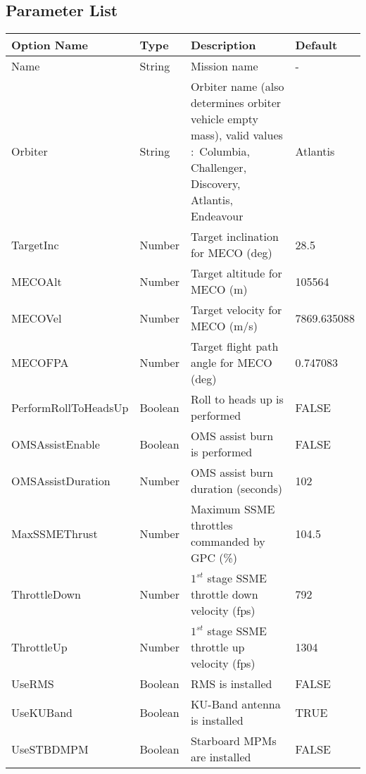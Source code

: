 \documentclass[Space_Shuttle_Ultra_Manual.tex]{subfiles}
\begin{document}
\newpage

\subsection{Parameter List}
\begin{table}[H]
  \centering
  \begin{tabular}{|l|p{1.5cm}|p{8cm}|l|}
	\hline
	\rule{0pt}{2ex}
	\textbf{Option Name} & \textbf{Type} & \textbf{Description} & \textbf{Default}\\
	\hline
	\rule{0pt}{2ex}
	Name & String & Mission name & -\\
	\hline
	\rule{0pt}{2ex}
	Orbiter & String & Orbiter name (also determines orbiter vehicle empty mass), valid values$\colon $ Columbia, Challenger, Discovery, Atlantis, Endeavour & Atlantis\\
	\hline
	\rule{0pt}{2ex}
	TargetInc & Number & Target inclination for MECO (deg) & 28.5\\
	\hline
	\rule{0pt}{2ex}
	MECOAlt & Number & Target altitude for MECO (m) & 105564\\
	\hline
	\rule{0pt}{2ex}
	MECOVel & Number & Target velocity for MECO (m/s) & 7869.635088\\
	\hline
	\rule{0pt}{2ex}
	MECOFPA & Number & Target flight path angle for MECO (deg) & 0.747083\\
	\hline
	\rule{0pt}{2ex}
	PerformRollToHeadsUp & Boolean & Roll to heads up is performed & FALSE\\
	\hline
	\rule{0pt}{2ex}
	OMSAssistEnable & Boolean & OMS assist burn is performed & FALSE\\
	\hline
	\rule{0pt}{2ex}
	OMSAssistDuration & Number & OMS assist burn duration (seconds) & 102\\
	\hline
	\rule{0pt}{2ex}
	MaxSSMEThrust & Number & Maximum SSME throttles commanded by GPC (\%) & 104.5\\
	\hline
	\rule{0pt}{2ex}
	ThrottleDown & Number & $1^{st}$ stage SSME throttle down velocity (fps) & 792\\
	\hline
	\rule{0pt}{2ex}
	ThrottleUp & Number & $1^{st}$ stage SSME throttle up velocity (fps) & 1304\\
	\hline
	\rule{0pt}{2ex}
	UseRMS & Boolean & RMS is installed & FALSE\\
	\hline
	\rule{0pt}{2ex}
	UseKUBand & Boolean & KU-Band antenna is installed & TRUE\\
	\hline
	\rule{0pt}{2ex}
	UseSTBDMPM & Boolean & Starboard MPMs are installed & FALSE\\

\end{tabular}
\end{table}
\end{document}
